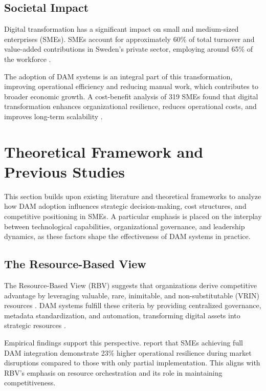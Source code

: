 \documentclass[a4paper,12pt,twocolumn]{article}
\begin{document}
\vspace{0.3cm} 
\subsection{Societal Impact}
Digital transformation has a significant impact on small and medium-sized enterprises (SMEs). SMEs account for approximately 
60\% of total turnover and value-added contributions in Sweden’s private sector, employing around 65\% of the workforce \citep{tillvaxtverket2021}.

\vspace{0.3cm}
The adoption of DAM systems is an integral part of this transformation, 
improving operational efficiency and reducing manual work,
which contributes to broader economic growth. A cost-benefit analysis of 319 SMEs 
found that digital transformation enhances organizational resilience, reduces 
operational costs, and improves long-term scalability \citep{teng2022}.

\justifying
\fussy

\section{Theoretical Framework and Previous Studies}
This section builds upon existing literature and theoretical frameworks to analyze how DAM adoption influences 
strategic decision-making, cost structures, and competitive positioning in SMEs. A particular emphasis is placed 
on the interplay between technological capabilities, organizational governance, and leadership dynamics,
as these factors shape the effectiveness of DAM systems in practice.


\subsection{The Resource-Based View}
The Resource-Based View (RBV) suggests that organizations derive competitive advantage by leveraging valuable, rare, inimitable, 
and non-substitutable (VRIN) resources \cite{barney1991}. DAM systems fulfill these criteria by providing centralized governance,
metadata standardization, and automation, transforming digital assets into strategic resources \cite{Chumphong2020}.

\vspace{0.3cm}
Empirical findings support this perspective. \cite{Chumphong2020} report that SMEs achieving full DAM integration 
demonstrate 23\% higher operational resilience during market disruptions compared to those with only partial implementation. 
This aligns with RBV’s emphasis on resource orchestration and its role in maintaining competitiveness.
\end{document}
